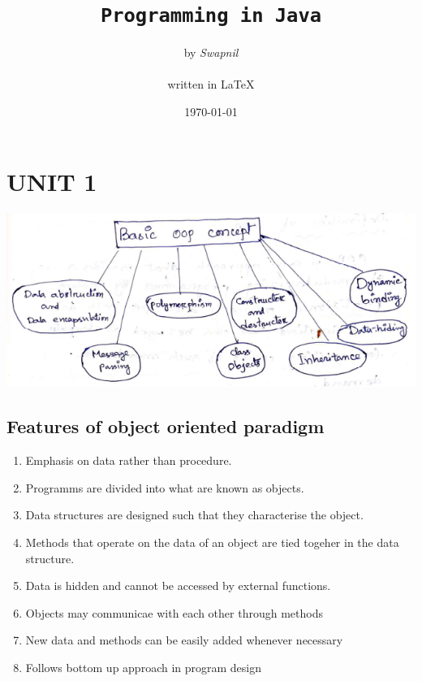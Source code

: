 \documentclass[11pt, a4paper]{book}
\title{\Huge{\texttt{Programming in Java}
                    }
              }
\author{\huge{by \emph{Swapnil}}\\ \\ \Large{written in {\LaTeX}
                                                    }
              }
\date{\today}
\begin{document}
      \maketitle
      \thispagestyle{empty}
      \newpage

      \setcounter{tocdepth}{3}
      \tableofcontents




  \chapter{UNIT 1}%
    \includegraphics[scale=0.85]{basicoopconcept}
    \section{Features of object oriented paradigm}
      \begin{enumerate}
  
        \item Emphasis on data rather than procedure.
        \item Programms are divided into what are known as objects.
        \item Data structures are designed such that they characterise the object.
        \item Methods that operate on the data of an object are tied togeher in the data structure.
        \item Data is hidden and cannot be accessed by external functions.
        \item Objects may communicae with each other through methods 
        \item New data and methods can be easily added whenever necessary 
        \item Follows bottom up approach in program design
  
      \end{enumerate}
  
\end{document}
